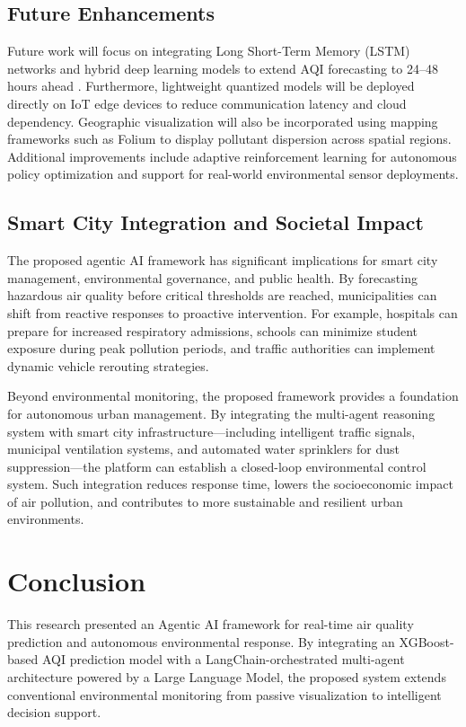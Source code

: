 \documentclass[conference]{IEEEtran}
\begin{document}
\subsection{Future Enhancements}

Future work will focus on integrating Long Short-Term
Memory (LSTM) networks and hybrid deep learning models
to extend AQI forecasting to 24--48 hours ahead \cite{b23,b24,b33,b34}.
Furthermore, lightweight quantized models will be deployed
directly on IoT edge devices to reduce communication
latency and cloud dependency. Geographic visualization will
also be incorporated using mapping frameworks such as
Folium to display pollutant dispersion across spatial regions.
Additional improvements include adaptive reinforcement
learning for autonomous policy optimization and support for
real-world environmental sensor deployments.

\subsection{Smart City Integration and Societal Impact}

The proposed agentic AI framework has significant
implications for smart city management, environmental
governance, and public health. By forecasting hazardous air
quality before critical thresholds are reached, municipalities
can shift from reactive responses to proactive intervention.
For example, hospitals can prepare for increased respiratory
admissions, schools can minimize student exposure during
peak pollution periods, and traffic authorities can implement
dynamic vehicle rerouting strategies.

Beyond environmental monitoring, the proposed framework
provides a foundation for autonomous urban management.
By integrating the multi-agent reasoning system with smart
city infrastructure—including intelligent traffic signals,
municipal ventilation systems, and automated water
sprinklers for dust suppression—the platform can establish a
closed-loop environmental control system. Such integration
reduces response time, lowers the socioeconomic impact of
air pollution, and contributes to more sustainable and
resilient urban environments.

\section{Conclusion}

This research presented an Agentic AI framework for
real-time air quality prediction and autonomous
environmental response. By integrating an XGBoost-based
AQI prediction model with a LangChain-orchestrated
multi-agent architecture powered by a Large Language
Model, the proposed system extends conventional
environmental monitoring from passive visualization to
intelligent decision support.
\end{document}

